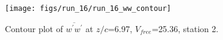 \begin{figure}[H]
\centering
\texttt{[image: figs/run\_16/run\_16\_ww\_contour]}
\caption{Contour plot of $\overline{w^\prime w^\prime}$ at $z/c$=6.97, $V_{free}$=25.36, station 2.}
\label{fig:run_16_ww_contour}
\end{figure}



